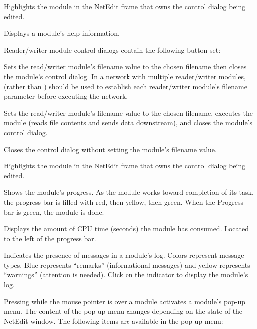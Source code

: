 \begin{description}
\begin{description}
     Highlights the module in the NetEdit frame
    that owns the control dialog being edited.

     Displays a module's help information.

  \end{description}

  Reader/writer module control dialogs contain the following button
  set:

  \begin{description}
     Sets the read/writer module's filename value to the
    chosen filename then closes the module's control dialog.  In a
    network with multiple reader/writer modules, 
    (rather than ) should be used to establish each
    reader/writer module's filename parameter before executing the
    network.
    
      Sets the read/writer module's filename value
    to the chosen filename, executes the module (reads file contents
    and sends data downstream), and closes the module's
    control dialog.
    
     Closes the control dialog without setting the
    module's filename value.
    
     Highlights the module in the NetEdit frame
    that owns the control dialog being edited.
    
  \end{description}
  
   Shows the module's progress.  As the module
  works toward completion of its task, the progress bar is filled
  with red, then yellow, then green.  When the Progress bar
  is green, the module is done.
  
   Displays the amount of CPU time (seconds) the module has
  consumed.  Located to the left of the progress bar.
  
   Indicates the presence of messages in a
  module's log.  Colors represent message types.  Blue represents
  ``remarks'' (informational messages) and yellow represents
  ``warnings'' (attention is needed).  Click  on the
  indicator to display the module's log.
  
   Pressing  while the mouse pointer is
  over a module activates a module's pop-up menu.  The content
  of the pop-up menu changes depending on the state of the NetEdit
  window. The following items are available in the pop-up menu:


\end{description}
